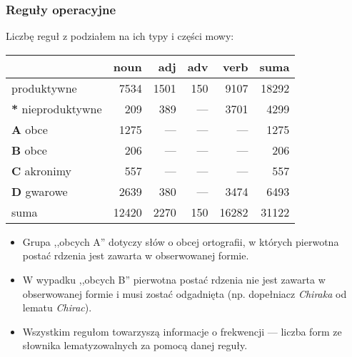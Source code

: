 \documentclass{beamer}
\begin{document}
\begin{frame}
\frametitle{Reguły operacyjne}
Liczbę reguł z podziałem na ich typy i części mowy:
\begin{center}

\begin{tabular}{l|r|r|r|r|r}
                              &  noun &  adj & adv &  verb &  suma \\
\hline
	           produktywne    &  7534 & 1501 & 150 &  9107 & 18292 \\
\hline
	\textbf{*} nieproduktywne &   209 &  389 & --- &  3701 &  4299 \\
\hline
	\textbf{A} obce           &  1275 &  --- & --- &   --- &  1275 \\
\hline
	\textbf{B} obce           &   206 &  --- & --- &   --- &   206 \\
\hline
	\textbf{C} akronimy       &   557 &  --- & --- &   --- &   557 \\
\hline
	\textbf{D} gwarowe        &  2639 &  380 & --- &  3474 &  6493 \\
\hline
	         suma             & 12420 & 2270 & 150 & 16282 & 31122 \\
\end{tabular}
\end{center}
\begin{itemize}
\item Grupa ,,obcych A'' dotyczy słów o obcej ortografii, w których pierwotna postać rdzenia jest zawarta w obserwowanej formie.
\item W wypadku ,,obcych B'' pierwotna postać rdzenia nie jest zawarta w obserwowanej formie i musi zostać odgadnięta (np. dopełniacz \textit{Chiraka} od lematu \textit{Chirac}).
\item Wszystkim regułom towarzyszą informacje o frekwencji --- liczba form ze słownika lematyzowalnych za pomocą danej reguły. 
\end{itemize}
\end{frame}
\end{document}
